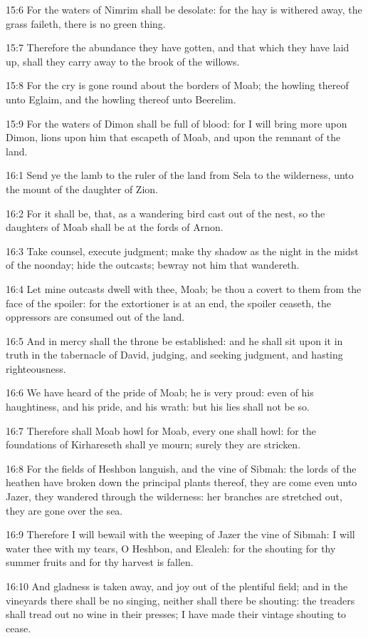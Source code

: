 15:6 For the waters of Nimrim shall be desolate: for the hay is
withered away, the grass faileth, there is no green thing.

15:7 Therefore the abundance they have gotten, and that which they
have laid up, shall they carry away to the brook of the willows.

15:8 For the cry is gone round about the borders of Moab; the howling
thereof unto Eglaim, and the howling thereof unto Beerelim.

15:9 For the waters of Dimon shall be full of blood: for I will bring
more upon Dimon, lions upon him that escapeth of Moab, and upon the
remnant of the land.

16:1 Send ye the lamb to the ruler of the land from Sela to the
wilderness, unto the mount of the daughter of Zion.

16:2 For it shall be, that, as a wandering bird cast out of the nest,
so the daughters of Moab shall be at the fords of Arnon.

16:3 Take counsel, execute judgment; make thy shadow as the night in
the midst of the noonday; hide the outcasts; bewray not him that
wandereth.

16:4 Let mine outcasts dwell with thee, Moab; be thou a covert to them
from the face of the spoiler: for the extortioner is at an end, the
spoiler ceaseth, the oppressors are consumed out of the land.

16:5 And in mercy shall the throne be established: and he shall sit
upon it in truth in the tabernacle of David, judging, and seeking
judgment, and hasting righteousness.

16:6 We have heard of the pride of Moab; he is very proud: even of his
haughtiness, and his pride, and his wrath: but his lies shall not be
so.

16:7 Therefore shall Moab howl for Moab, every one shall howl: for the
foundations of Kirhareseth shall ye mourn; surely they are stricken.

16:8 For the fields of Heshbon languish, and the vine of Sibmah: the
lords of the heathen have broken down the principal plants thereof,
they are come even unto Jazer, they wandered through the wilderness:
her branches are stretched out, they are gone over the sea.

16:9 Therefore I will bewail with the weeping of Jazer the vine of
Sibmah: I will water thee with my tears, O Heshbon, and Elealeh: for
the shouting for thy summer fruits and for thy harvest is fallen.

16:10 And gladness is taken away, and joy out of the plentiful field;
and in the vineyards there shall be no singing, neither shall there be
shouting: the treaders shall tread out no wine in their presses; I
have made their vintage shouting to cease.

